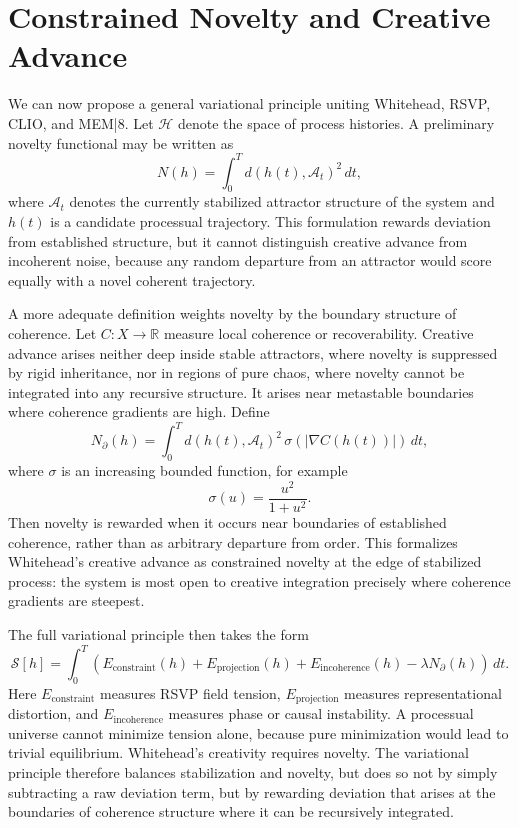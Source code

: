 \documentclass[12pt,a4paper]{article}
\begin{document}
\section{Constrained Novelty and Creative Advance}

We can now propose a general variational principle uniting Whitehead, RSVP, CLIO, and MEM|8. Let \(\mathcal{H}\) denote the space of process histories. A preliminary novelty functional may be written as
\[
N(h)=\int_0^T d(h(t),\mathcal{A}_t)^2\,dt,
\]
where \(\mathcal{A}_t\) denotes the currently stabilized attractor structure of the system and \(h(t)\) is a candidate processual trajectory. This formulation rewards deviation from established structure, but it cannot distinguish creative advance from incoherent noise, because any random departure from an attractor would score equally with a novel coherent trajectory.

A more adequate definition weights novelty by the boundary structure of coherence. Let \(C:X\to\mathbb{R}\) measure local coherence or recoverability. Creative advance arises neither deep inside stable attractors, where novelty is suppressed by rigid inheritance, nor in regions of pure chaos, where novelty cannot be integrated into any recursive structure. It arises near metastable boundaries where coherence gradients are high. Define
\[
N_{\partial}(h)
=
\int_0^T
d(h(t),\mathcal{A}_t)^2
\,
\sigma(|\nabla C(h(t))|)
\,dt,
\]
where \(\sigma\) is an increasing bounded function, for example
\[
\sigma(u)=\frac{u^2}{1+u^2}.
\]
Then novelty is rewarded when it occurs near boundaries of established coherence, rather than as arbitrary departure from order. This formalizes Whitehead's creative advance as constrained novelty at the edge of stabilized process: the system is most open to creative integration precisely where coherence gradients are steepest.

The full variational principle then takes the form
\[
\mathcal{S}[h]
=
\int_0^T
\left(
E_{\mathrm{constraint}}(h)
+
E_{\mathrm{projection}}(h)
+
E_{\mathrm{incoherence}}(h)
-
\lambda N_{\partial}(h)
\right)\,dt.
\]
Here \(E_{\mathrm{constraint}}\) measures RSVP field tension, \(E_{\mathrm{projection}}\) measures representational distortion, and \(E_{\mathrm{incoherence}}\) measures phase or causal instability. A processual universe cannot minimize tension alone, because pure minimization would lead to trivial equilibrium. Whitehead's creativity requires novelty. The variational principle therefore balances stabilization and novelty, but does so not by simply subtracting a raw deviation term, but by rewarding deviation that arises at the boundaries of coherence structure where it can be recursively integrated.
\end{document}
